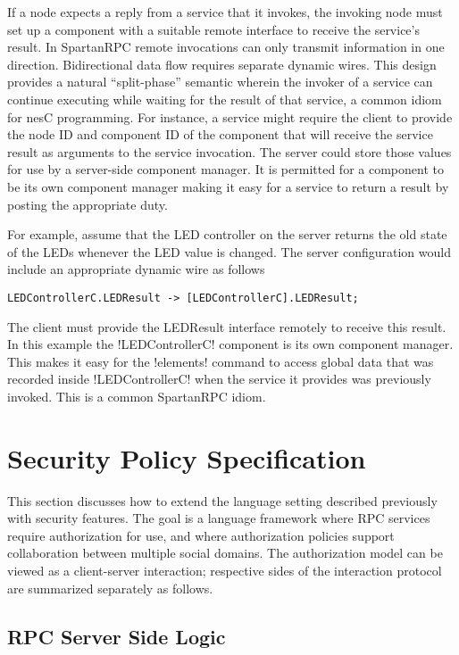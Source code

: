 If a node expects a reply from a service that it invokes, the invoking node must set up a
component with a suitable remote interface to receive the service's result. In SpartanRPC remote
invocations can only transmit information in one direction. Bidirectional data flow requires
separate dynamic wires. This design provides a natural ``split-phase'' semantic wherein the
invoker of a service can continue executing while waiting for the result of that service, a
common idiom for nesC programming. For instance, a service might require the client to provide
the node ID and component ID of the component that will receive the service result as arguments
to the service invocation. The server could store those values for use by a server-side
component manager. It is permitted for a component to be its own component manager making it
easy for a service to return a result by posting the appropriate duty.

For example, assume that the LED controller on the server returns the old state of the LEDs
whenever the LED value is changed. The server configuration would include an appropriate
dynamic wire as follows
\begin{lstlisting}
LEDControllerC.LEDResult -> [LEDControllerC].LEDResult;
\end{lstlisting}

The client must provide the LEDResult interface remotely to receive this result. In this example
the !LEDControllerC! component is its own component manager. This makes it easy for the
!elements! command to access global data that was recorded inside !LEDControllerC! when the
service it provides was previously invoked. This is a common SpartanRPC idiom.

\section{Security Policy Specification}
\label{section-security-extensions}

This section discusses how to extend the language setting described previously with security
features. The goal is a language framework where RPC services require authorization for use, and
where authorization policies support collaboration between multiple social domains. The
authorization model can be viewed as a client-server interaction; respective sides of the
interaction protocol are summarized separately as follows.

\subsection{RPC Server Side Logic}
\label{section-rpc-server-side}

